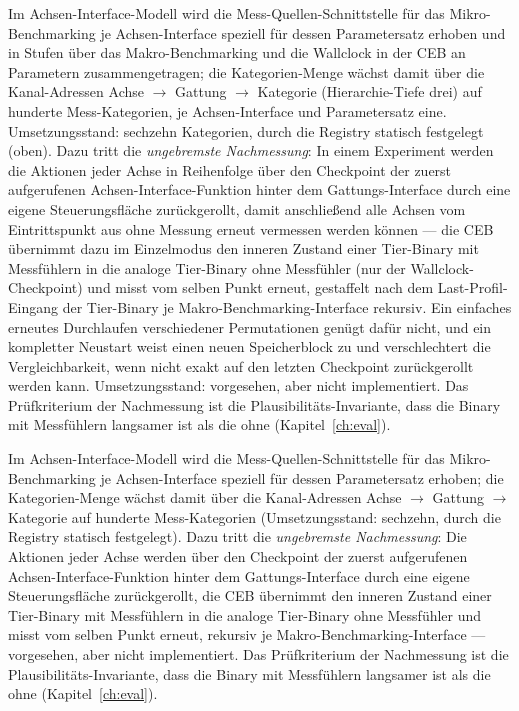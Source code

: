 \begin{nurlang}
Im Achsen-Interface-Modell wird die Mess-Quellen-Schnittstelle für das Mikro-Benchmarking je
Achsen-Interface speziell für dessen Parametersatz erhoben und in Stufen über das Makro-Benchmarking und
die Wallclock in der CEB an Parametern zusammengetragen; die Kategorien-Menge wächst damit über die
Kanal-Adressen Achse $\to$ Gattung $\to$ Kategorie (Hierarchie-Tiefe drei) auf hunderte Mess-Kategorien, je
Achsen-Interface und Parametersatz eine. Umsetzungsstand: sechzehn Kategorien, durch die Registry statisch festgelegt
(oben). Dazu tritt die \emph{ungebremste Nachmessung}: In einem Experiment werden die Aktionen jeder
Achse in Reihenfolge über den Checkpoint der zuerst aufgerufenen Achsen-Interface-Funktion hinter dem
Gattungs-Interface durch eine eigene Steuerungsfläche zurückgerollt, damit anschließend alle Achsen vom
Eintrittspunkt aus ohne Messung erneut vermessen werden können --- die CEB übernimmt dazu im Einzelmodus
den inneren Zustand einer Tier-Binary mit Messfühlern in die analoge Tier-Binary ohne Messfühler (nur der
Wallclock-Checkpoint) und misst vom selben Punkt erneut, gestaffelt nach dem Last-Profil-Eingang der
Tier-Binary je Makro-Benchmarking-Interface rekursiv. Ein einfaches erneutes Durchlaufen verschiedener
Permutationen genügt dafür nicht, und ein kompletter Neustart weist einen neuen Speicherblock zu und
verschlechtert die Vergleichbarkeit, wenn nicht exakt auf den letzten Checkpoint zurückgerollt werden
kann. Umsetzungsstand: vorgesehen, aber nicht implementiert. Das Prüfkriterium der Nachmessung ist die Plausibilitäts-Invariante,
dass die Binary mit Messfühlern langsamer ist als die ohne (Kapitel~\ref{ch:eval}).
\end{nurlang}
\begin{nurkurz}
Im Achsen-Interface-Modell wird die Mess-Quellen-Schnittstelle für das Mikro-Benchmarking je
Achsen-Interface speziell für dessen Parametersatz erhoben; die Kategorien-Menge wächst damit über die
Kanal-Adressen Achse $\to$ Gattung $\to$ Kategorie auf hunderte Mess-Kategorien (Umsetzungsstand: sechzehn,
durch die Registry statisch festgelegt). Dazu tritt die \emph{ungebremste Nachmessung}: Die Aktionen jeder
Achse werden über den Checkpoint der zuerst aufgerufenen Achsen-Interface-Funktion hinter dem
Gattungs-Interface durch eine eigene Steuerungsfläche zurückgerollt, die CEB übernimmt den inneren Zustand
einer Tier-Binary mit Messfühlern in die analoge Tier-Binary ohne Messfühler und misst vom selben Punkt
erneut, rekursiv je Makro-Benchmarking-Interface --- vorgesehen, aber nicht implementiert. Das
Prüfkriterium der Nachmessung ist die Plausibilitäts-Invariante, dass die Binary mit Messfühlern langsamer
ist als die ohne (Kapitel~\ref{ch:eval}).
\end{nurkurz}


